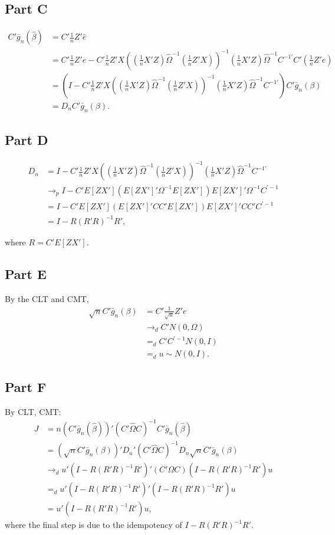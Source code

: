 \documentclass[11pt]{article} %
\begin{document}
\subsection{Part C}
\begin{align*}
C'\bar{g}_n(\hat{\beta}) &= C'\frac{1}{n}Z'\hat{e}\\
&= C'\frac{1}{n}Z'e - C'\frac{1}{n}Z'X\left(\left(\frac{1}{n} X'Z \right) \hat{\Omega}^{-1}\left( \frac{1}{n} Z'X\right) \right)^{-1}\left( \frac{1}{n}X'Z \right)\hat{\Omega}^{-1}C^{-1'}C' \left( \frac{1}{n} Z'e\right)\\
&= \left( I -  C'\frac{1}{n}Z'X\left(\left(\frac{1}{n} X'Z \right) \hat{\Omega}^{-1}\left( \frac{1}{n} Z'X\right) \right)^{-1}\left( \frac{1}{n}X'Z \right)\hat{\Omega}^{-1}C^{-1'} \right)C'\bar{g}_n(\beta)\\
&= D_nC'\bar{g}_n(\beta).
\end{align*}
\subsection{Part D}
\begin{align*}
D_n &=  I -  C'\frac{1}{n}Z'X\left(\left(\frac{1}{n} X'Z \right) \hat{\Omega}^{-1}\left( \frac{1}{n} Z'X\right) \right)^{-1}\left( \frac{1}{n}X'Z \right)\hat{\Omega}^{-1}C^{-1'} \\
&\rightarrow_p I - C'E[ZX']\left( E[ZX']' \Omega^{-1}E[ZX'] \right)E[ZX']'\Omega^{-1}C^{'-1}\\
&= I - C'E[ZX']\left( E[ZX']' CC'E[ZX'] \right)E[ZX']'CC'C^{'-1}\\
&= I - R(R'R)^{-1}R',
\end{align*}

where $R = C'E[ZX']$.
\subsection{Part E}
By the CLT and CMT,
\begin{align*}
\sqrt{n}C'\bar{g}_n(\beta) &= C'\frac{1}{\sqrt{n}} Z'e\\
&\rightarrow_d C'N(0,\Omega)\\
&=_d C'C^{'-1}N(0,I)\\
&=_d u\sim N(0,I). 
\end{align*}
\subsection{Part F}
By CLT, CMT:
\begin{align*}
J &= n(C'\bar{g}_n(\hat{\beta}))'(C'\hat{\Omega}C)^{-1}C'\bar{g}_n(\hat{\beta})\\
&= (\sqrt{n}C'\bar{g}_n(\beta))'D_n'(C'\hat{\Omega}C)^{-1}D_n\sqrt{n}C'\bar{g}_n(\beta)\\
&\rightarrow_d u' (I-R(R'R)^{-1}R')'(C'\Omega C)(I-R(R'R)^{-1}R')u\\
&=_d u'(I-R(R'R)^{-1}R')'(I-R(R'R)^{-1}R') u\\
&= u'(I-R(R'R)^{-1}R')u,
\end{align*}
where the final step is due to the idempotency of $I-R(R'R)^{-1}R'$.
\end{document}
